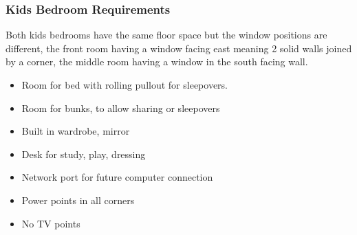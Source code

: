 \subsubsection{Kids Bedroom Requirements}
Both kids bedrooms have the same floor space but the window positions are different, the front room having a window facing east meaning 2 solid walls joined by a corner, the middle room having a window in the south facing wall.

\begin{itemize}
\item Room for bed with rolling pullout for sleepovers. 
\item Room for bunks, to allow sharing or sleepovers
\item Built in wardrobe, mirror
\item Desk for study, play, dressing
\item Network port for future computer connection
\item Power points in all corners
\item No TV points
\end{itemize}
